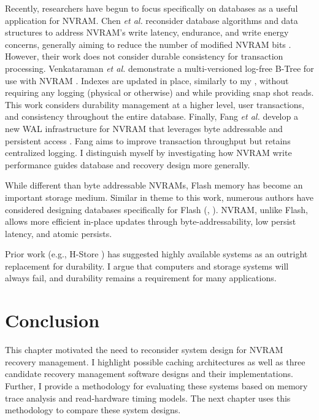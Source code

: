 Recently, researchers have begun to focus specifically on databases as a useful application for NVRAM.
Chen \emph{et al.} reconsider database algorithms and data structures to address NVRAM's write latency, endurance, and write energy concerns, generally aiming to reduce the number of modified NVRAM bits \cite{ChenGibbons11}.
However, their work does not consider durable consistency for transaction processing.
Venkataraman \emph{et al.} demonstrate a multi-versioned log-free B-Tree for use with NVRAM \cite{VenkataramanTolia11}.
Indexes are updated in place, similarly to my \InPlace, without requiring any logging (physical or otherwise) and while providing snap shot reads.
This work considers durability management at a higher level, user transactions, and consistency throughout the entire database.
Finally, Fang \emph{et al.} develop a new WAL infrastructure for NVRAM that leverages byte addressable and persistent access \cite{FangHsiao11}.
Fang aims to improve transaction throughput but retains centralized logging.
I distinguish myself by investigating how NVRAM write performance guides database and recovery design more generally.

While different than byte addressable NVRAMs, Flash memory has become an important storage medium.
Similar in theme to this work, numerous authors have considered designing databases specifically for Flash (\cite{BernsteinReid11}, \cite{SarwatMokbel11}).
NVRAM, unlike Flash, allows more efficient in-place updates through byte-addressability, low persist latency, and atomic persists.

Prior work (e.g., H-Store \cite{StonebrakerMadden07}) has suggested highly available systems as an outright replacement for durability.
I argue that computers and storage systems will always fail, and durability remains a requirement for many applications.

\section{Conclusion}
\label{sec:OLTP_design:Conclusion}
This chapter motivated the need to reconsider system design for NVRAM recovery management.
I highlight possible caching architectures as well as three candidate recovery management software designs and their implementations.
Further, I provide a methodology for evaluating these systems based on memory trace analysis and read-hardware timing models.
The next chapter uses this methodology to compare these system designs.
